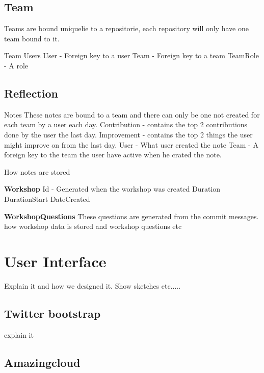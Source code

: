\subsection{Team}
Teams are bound uniquelie to a repositorie, each repository will only have one team bound to it. %

Team Users
User - Foreign key to a user
Team - Foreign key to a team
TeamRole - A role 

\subsection{Reflection}
Notes
These notes are bound to a team and there can only be one not created for each team by a user each day.
Contribution - contains the top 2 contributions done by the user the last day.
Improvement - contains the top 2 things the user might improve on from the last day.
User - What user created the note
Team - A foreign key to the team the user have active when he crated the note.

How notes are stored

\textbf{Workshop} 
Id - Generated when the workshop was created
Duration
DurationStart
DateCreated


\textbf{WorkshopQuestions}
These questions are generated from the commit messages.
how workshop data is stored and workshop questions etc

\section{User Interface}
Explain it and how we designed it. Show sketches etc.....

\subsection{Twitter bootstrap}
explain it

\subsection{Amazingcloud}